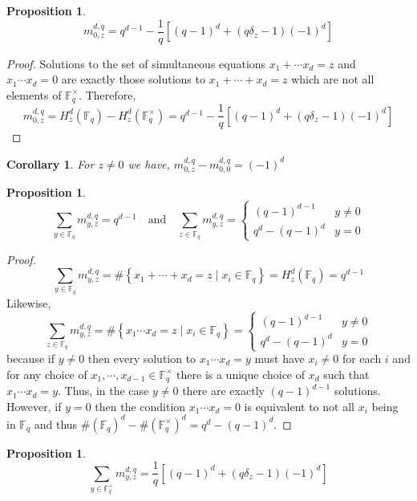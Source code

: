 \documentclass{article}
\newcommand{\finfield}[1]{\mathbb{F}_{#1}}
\newcommand{\finunits}[1]{\mathbb{F}_{#1}^\times}
\newtheorem{corollary}{Corollary}[theorem]
\newtheorem{proposition}[theorem]{Proposition}
\theoremstyle{definition}
\theoremstyle{definition}
\theoremstyle{remark}
\begin{document}
\begin{proposition}
\[ m^{d,q}_{0,z} = q^{d-1} - \frac{1}{q} \left[ (q-1)^d + (q \delta_z - 1)(-1)^d \right] \]
\end{proposition}

\begin{proof}
Solutions to the set of simultaneous equations $x_1 + \cdots x_d = z$ and $x_1 \cdots x_d = 0$ are exactly those solutions to $x_1 + \cdots + x_d = z$ which are not all elements of $\finunits{q}$. Therefore,
\[ m^{d,q}_{0,z} = H^d_z(\finfield{q}) - H^d_z(\finunits{q}) = q^{d-1} - \frac{1}{q} \left[ (q-1)^d + (q \delta_z - 1) (-1)^d \right] \]
\end{proof}

\begin{corollary} \label{cor:zero_y_difference}
For $z \neq 0$ we have, $m^{d,q}_{0,z} - m^{d,q}_{0,0} = (-1)^d$
\end{corollary}

\begin{proposition}
\[ \sum_{y \in \finfield{q}} m^{d,q}_{y,z} = q^{d-1} \quad \text{and} \quad \sum_{z \in \finfield{q}} m^{d,q}_{y,z} = 
\begin{cases}
(q-1)^{d-1} & y \neq 0 
\\
q^d -(q-1)^d & y = 0
\end{cases} \]
\end{proposition}

\begin{proof}
\[ \sum_{y \in \finfield{q}} m^{d,q}_{y,z} = \# \left\{ x_1 + \cdots + x_d = z \mid x_i \in \finfield{q} \right\} = H^d_z(\finfield{q}) = q^{d-1} \]
Likewise,
\[ \sum_{z \in \finfield{q}} m^{d,q}_{y,z} = \# \left\{ x_1  \cdots  x_d = z \mid x_i \in \finfield{q} \right\} = \begin{cases}
(q-1)^{d-1} & y \neq 0 
\\
q^d -(q-1)^d & y = 0
\end{cases} \]
because if $y \neq 0$ then every solution to $x_1 \cdots x_d = y$ must have $x_i \neq 0$ for each $i$ and for any choice of $x_1, \cdots, x_{d-1} \in \finunits{q}$ there is a unique choice of $x_d$ such that $x_1 \cdots x_d = y$. Thus, in the case $y \neq 0$ there are exactly $(q-1)^{d-1}$ solutions. However, if $y = 0$ then the condition $x_1 \cdots x_d = 0$ is equivalent to not all $x_i$ being in $\finfield{q}$ and thus $\# (\finfield{q})^d - \# (\finunits{q})^d = q^d - (q-1)^d$. 
\end{proof}

\begin{proposition}
\[ \sum_{y \in \finunits{q}} m^{d,q}_{y,z} = \frac{1}{q}\left[ (q-1)^d + (q \delta_z - 1)(-1)^d \right] \]
\end{proposition}
\end{document}
